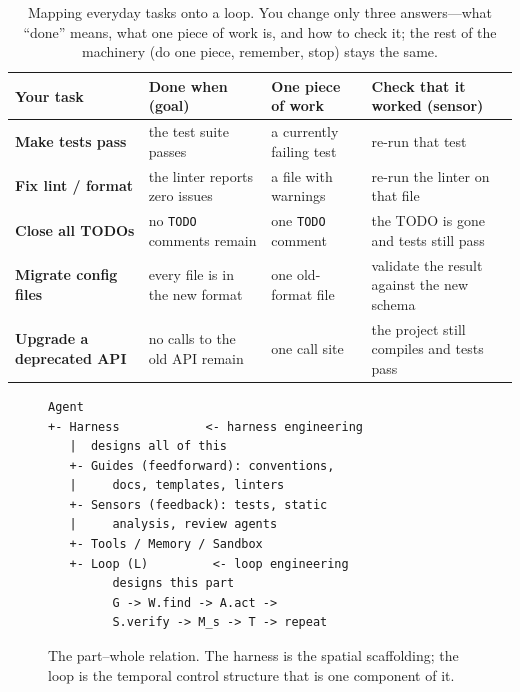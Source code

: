 \documentclass[10pt,twocolumn,letterpaper]{article}
\begin{document}
\begin{table}[t]
\centering
\caption{Mapping everyday tasks onto a loop. You change only three answers---what
``done'' means, what one piece of work is, and how to check it; the rest of the
machinery (do one piece, remember, stop) stays the same.}
\label{tab:map}
\small
\renewcommand{\arraystretch}{1.2}
\begin{tabular}{@{}>{\bfseries}p{} p{} p{} p{}@{}}
\toprule
Your task & Done when (goal) & One piece of work & Check that it worked (sensor) \\
\midrule
Make tests pass    & the test suite passes            & a currently failing test   & re-run that test \\
Fix lint / format  & the linter reports zero issues   & a file with warnings       & re-run the linter on that file \\
Close all TODOs     & no \texttt{TODO} comments remain & one \texttt{TODO} comment  & the TODO is gone and tests still pass \\
Migrate config files & every file is in the new format & one old-format file       & validate the result against the new schema \\
Upgrade a deprecated API & no calls to the old API remain & one call site          & the project still compiles and tests pass \\
\bottomrule
\end{tabular}
\end{table}

\begin{figure}[t]
\centering
\begin{lstlisting}
Agent
+- Harness            <- harness engineering
   |  designs all of this
   +- Guides (feedforward): conventions,
   |     docs, templates, linters
   +- Sensors (feedback): tests, static
   |     analysis, review agents
   +- Tools / Memory / Sandbox
   +- Loop (L)         <- loop engineering
         designs this part
         G -> W.find -> A.act ->
         S.verify -> M_s -> T -> repeat
\end{lstlisting}
\caption{The part--whole relation. The harness is the spatial scaffolding; the
loop is the temporal control structure that is one component of it.}
\label{fig:nest}
\end{figure}
\end{document}
